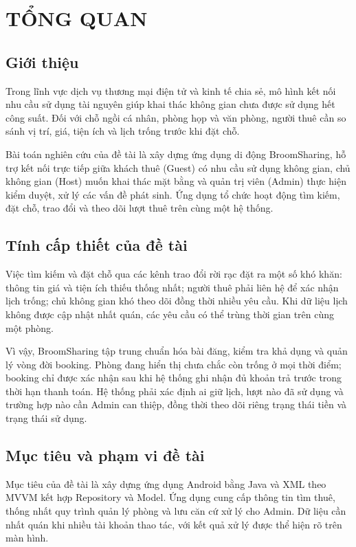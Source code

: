 \chapstart
\section{TỔNG QUAN}
\subsection{Giới thiệu}
Trong lĩnh vực dịch vụ thương mại điện tử và kinh tế chia sẻ, mô hình kết nối nhu cầu sử dụng tài nguyên giúp khai thác không gian chưa được sử dụng hết công suất. Đối với chỗ ngồi cá nhân, phòng họp và văn phòng, người thuê cần so sánh vị trí, giá, tiện ích và lịch trống trước khi đặt chỗ.

Bài toán nghiên cứu của đề tài là xây dựng ứng dụng di động BroomSharing, hỗ trợ kết nối trực tiếp giữa khách thuê (Guest) có nhu cầu sử dụng không gian, chủ không gian (Host) muốn khai thác mặt bằng và quản trị viên (Admin) thực hiện kiểm duyệt, xử lý các vấn đề phát sinh. Ứng dụng tổ chức hoạt động tìm kiếm, đặt chỗ, trao đổi và theo dõi lượt thuê trên cùng một hệ thống.

\subsection{Tính cấp thiết của đề tài}
Việc tìm kiếm và đặt chỗ qua các kênh trao đổi rời rạc đặt ra một số khó khăn: thông tin giá và tiện ích thiếu thống nhất; người thuê phải liên hệ để xác nhận lịch trống; chủ không gian khó theo dõi đồng thời nhiều yêu cầu. Khi dữ liệu lịch không được cập nhật nhất quán, các yêu cầu có thể trùng thời gian trên cùng một phòng.

Vì vậy, BroomSharing tập trung chuẩn hóa bài đăng, kiểm tra khả dụng và quản lý vòng đời booking. Phòng đang hiển thị chưa chắc còn trống ở mọi thời điểm; booking chỉ được xác nhận sau khi hệ thống ghi nhận đủ khoản trả trước trong thời hạn thanh toán. Hệ thống phải xác định ai giữ lịch, lượt nào đã sử dụng và trường hợp nào cần Admin can thiệp, đồng thời theo dõi riêng trạng thái tiền và trạng thái sử dụng.

\subsection{Mục tiêu và phạm vi đề tài}
Mục tiêu của đề tài là xây dựng ứng dụng Android bằng Java và XML theo MVVM kết hợp Repository và Model. Ứng dụng cung cấp thông tin tìm thuê, thống nhất quy trình quản lý phòng và lưu căn cứ xử lý cho Admin. Dữ liệu cần nhất quán khi nhiều tài khoản thao tác, với kết quả xử lý được thể hiện rõ trên màn hình.

